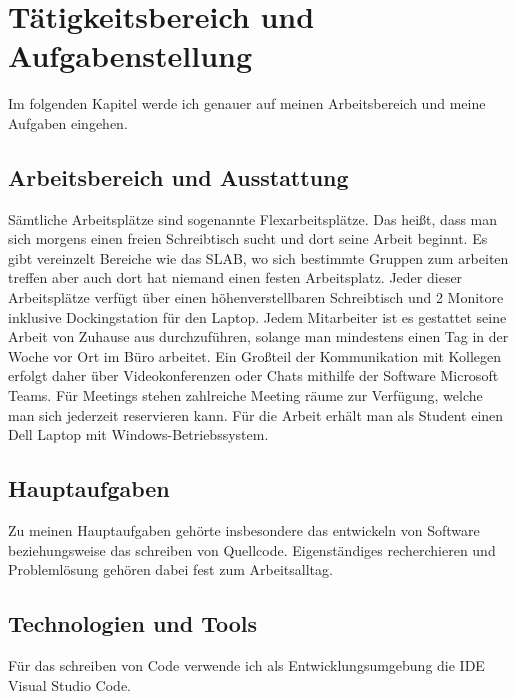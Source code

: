 \chapter{Tätigkeitsbereich und Aufgabenstellung}
Im folgenden Kapitel werde ich genauer auf meinen Arbeitsbereich und meine Aufgaben eingehen.

\section{Arbeitsbereich und Ausstattung}
Sämtliche Arbeitsplätze sind sogenannte Flexarbeitsplätze. Das heißt, dass man sich morgens einen freien Schreibtisch sucht und dort seine Arbeit beginnt. Es gibt vereinzelt Bereiche wie das SLAB, wo sich bestimmte Gruppen zum arbeiten treffen aber auch dort hat niemand einen festen Arbeitsplatz. Jeder dieser Arbeitsplätze verfügt über einen höhenverstellbaren Schreibtisch und 2 Monitore inklusive Dockingstation für den Laptop. Jedem Mitarbeiter ist es gestattet seine Arbeit von Zuhause aus durchzuführen, solange man mindestens einen Tag in der Woche vor Ort im Büro arbeitet. Ein Großteil der Kommunikation mit Kollegen erfolgt daher über Videokonferenzen oder Chats mithilfe der Software Microsoft Teams. Für Meetings stehen zahlreiche Meeting räume zur Verfügung, welche man sich jederzeit reservieren kann.
Für die Arbeit erhält man als Student einen Dell Laptop mit Windows-Betriebssystem. 

\section{Hauptaufgaben}
Zu meinen Hauptaufgaben gehörte insbesondere das entwickeln von Software beziehungsweise das schreiben von Quellcode. Eigenständiges recherchieren und Problemlösung gehören dabei fest zum Arbeitsalltag.


\section{Technologien und Tools}
Für das schreiben von Code verwende ich als Entwicklungsumgebung die IDE Visual Studio Code. 